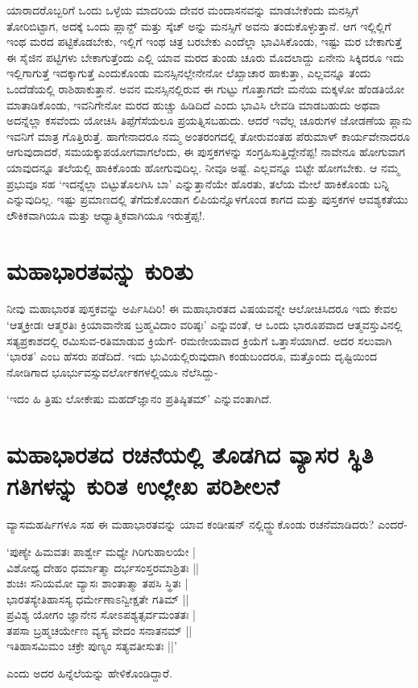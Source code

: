 ಯಾರಾದರೊಬ್ಬರಿಗೆ ಒಂದು ಒಳ್ಳೆಯ ಮಾದರಿಯ ದೇವರ ಮಂದಾಸನವನ್ನು ಮಾಡಬೇಕೆಂದು ಮನಸ್ಸಿಗೆ ತೋರಿಬಿಟ್ಟಾಗ, ಅದಕ್ಕೆ ಒಂದು ಪ್ಲಾನ್ೞ್ ಮತ್ತು ಸ್ಕೆಚ್ ಅನ್ನು ಮನಸ್ಸಿಗೆ ಅವನು ತಂದುಕೊಳ್ಳುತ್ತಾನೆ. ಆಗ ಇಲ್ಲಿಲ್ಲಿಗೆ ಇಂಥ ಮರದ ಪಟ್ಟಿಕೊಡಬೇಕು, ಇಲ್ಲಿಗೆ ಇಂಥ ಚಿತ್ರ ಬರಬೇಕು ಎಂದೆಲ್ಲಾ ಭಾವಿಸಿಕೊಂಡು, ಇಷ್ಟು ಮರ ಬೇಕಾಗುತ್ತೆ ಈ ಸೈಜಿನ ಪಟ್ಟಿಗಳು ಬೇಕಾಗುತ್ತೆಂದು ಎಲ್ಲಿ ಯಾವ ಮರದ ತುಂಡು ಚೂರು ಮೊದಲಾದ್ದು ಏನೇನು ಸಿಕ್ಕಿದರೂ ಇದು ಇಲ್ಲಿಗಾಗುತ್ತೆ ಇದಕ್ಕಾಗುತ್ತೆ ಎಂದುಕೊಂಡು ಮನಸ್ಸಿನಲ್ಲೇನೇನೋ ಲೆಖ್ಖಾಚಾರ ಹಾಕುತ್ತಾ, ಎಲ್ಲವನ್ನೂ ತಂದು ಒಂದೆಡೆಯಲ್ಲಿ ರಾಶಿಹಾಕುತ್ತಾನೆ. ಅವನ ಮನಸ್ಸಿನಲ್ಲಿರುವ ಈ ಗುಟ್ಟು ಗೊತ್ತಾಗದೇ ಮನೆಯ ಮಕ್ಕಳೋ ಹೆಂಡತಿಯೋ ಮಾತಾಡಿಕೊಂಡು, ಇವನಿಗೇನೋ ಮರದ ಹುಚ್ಚು ಹಿಡಿದಿದೆ ಎಂದು ಭಾವಿಸಿ ಲೇವಡಿ ಮಾಡಬಹುದು ಅಥವಾ ಅದನ್ನೆಲ್ಲಾ ಕಸವೆಂದು ಯೋಚಿಸಿ ತಿಪ್ಪೆಗೆಸೆಯಲೂ ಪ್ರಯತ್ನಿಸಬಹುದು. ಆದರೆ ಇವೆಲ್ಲ ಚೂರುಗಳ ಜೋಡಣೆಯ ಪ್ಲಾನು ಇವನಿಗೆ ಮಾತ್ರ ಗೊತ್ತಿರುತ್ತೆ. ಹಾಗೇನಾದರೂ ನಮ್ಮ ಅಂತರಂಗದಲ್ಲಿ ತೋರುವಂತಹ ಪೆರುಮಾಳ್ ಕಾರ್ಯವೇನಾದರೂ ಆಗುವುದಾದರೆ, ಸಮಯಕ್ಕುಪಯೋಗವಾಗಲೆಂದು, ಈ ಪುಸ್ತಕಗಳನ್ನು ಸಂಗ್ರಹಿಸುತ್ತಿದ್ದೇನೆಪ್ಪ! ನಾವೇನೂ ಹೋಗುವಾಗ ಯಾವುದನ್ನೂ ತಲೆಯಲ್ಲಿ ಹಾಕಿಕೊಂಡು ಹೋಗುವುದಿಲ್ಲ. ನೀವೂ ಅಷ್ಟೆ. ಎಲ್ಲವನ್ನೂ ಬಿಟ್ಟೇ ಹೋಗಬೇಕು. ಆ ನಮ್ಮ ಪ್ರಭುವೂ ಸಹ `ಇದನ್ನೆಲ್ಲಾ ಬಿಟ್ಟುತೊಲಗಿಸಿ ಬಾ' ಎನ್ನುತ್ತಾನೆಯೇ ಹೊರತು, ತಲೆಯ ಮೇಲೆ ಹಾಕಿಕೊಂಡು ಬನ್ನಿ ಎನ್ನುವುದಿಲ್ಲ. ಇಷ್ಟು  ಪ್ರಮಾಣದಲ್ಲಿ ತೆಗೆದುಕೊಂಡಾಗ ಲಿಪಿಯನ್ನೊಳಗೊಂಡ ಕಾಗದ ಮತ್ತು ಪುಸ್ತಕಗಳ ಆವಶ್ಯಕತೆಯು ಲೌಕಿಕವಾಗಿಯೂ ಮತ್ತು ಆಧ್ಯಾತ್ಮಿಕವಾಗಿಯೂ ಇರುತ್ತೆಪ್ಪ!.

\section*{ಮಹಾಭಾರತವನ್ನು ಕುರಿತು}

ನೀವು ಮಹಾಭಾರತ ಪುಸ್ತಕವನ್ನು ಅರ್ಪಿಸಿದಿರಿ! ಈ ಮಹಾಭಾರತದ ವಿಷಯವನ್ನೇ ಆಲೋಚಿಸಿದರೂ ಇದು ಕೇವಲ `ಆತ್ಮಕ್ರೀಡಃ ಆತ್ಮರತಿಃ ಕ್ರಿಯಾವಾನೇಷ ಬ್ರಹ್ಮವಿದಾಂ ವರಿಷ್ಠಃ' ಎನ್ನುವಂತೆ, ಆ ಒಂದು ಭಾರೂಪವಾದ ಆತ್ಮವಸ್ತುವಿನಲ್ಲಿ ಸತ್ಯಪ್ರಕಾಶದಲ್ಲಿ ರಮಿಸುವ-ರತಿಮಾಡುವ ಕ್ರಿಯೆಗೆ- ರಮಣೀಯವಾದ ಕ್ರಿಯೆಗೆ ಒತ್ತಾಸೆಯಾಗಿದೆ. ಅದರ ಸಲುವಾಗಿ `ಭಾರತ' ಎಂಬ ಹೆಸರು ಪಡೆದಿದೆ. ಇದು ಭುವಿಯಲ್ಲಿರುವುದಾಗಿ ಕಂಡುಬಂದರೂ, ಮತ್ತೊಂದು ದೃಷ್ಟಿಯಿಂದ ನೋಡಿಗಾದ ಭೂರ್ಭುವಸ್ಸುವರ್ಲೋಕಗಳಲ್ಲಿಯೂ ನೆಲೆಸಿದ್ದು-

\begin{shloka}
`ಇದಂ ಹಿ ತ್ರಿಷು ಲೋಕೇಷು ಮಹದ್‌ಜ್ಞಾನಂ ಪ್ರತಿಷ್ಠಿತಮ್' ಎನ್ನುವಂತಾಗಿದೆ.
\end{shloka}

\section*{ಮಹಾಭಾರತದ ರಚನೆಯಲ್ಲಿ ತೊಡಗಿದ ವ್ಯಾಸರ ಸ್ಥಿತಿ ಗತಿಗಳನ್ನು ಕುರಿತ ಉಲ್ಲೇಖ ಪರಿಶೀಲನೆ}

ವ್ಯಾಸಮಹರ್ಷಿಗಳೂ ಸಹ ಈ ಮಹಾಭಾರತವನ್ನು ಯಾವ ಕಂಡೀಷನ್ ನಲ್ಲಿದ್ದ್ದುಕೊಂಡು ರಚನೆಮಾಡಿದರು? ಎಂದರೆ-

\begin{shloka}
`ಪುಣ್ಯೇ ಹಿಮವತಃ ಪಾರ್ಶ್ವೇ ಮಧ್ಯೇ ಗಿರಿಗುಹಾಲಯೇ |\\
ವಿಶೋಧ್ಯ ದೇಹಂ ಧರ್ಮಾತ್ಮಾ ದರ್ಭಸಂಸ್ತರಮಾಶ್ರಿತಃ ||\\
ಶುಚಿಃ ಸನಿಯಮೋ ವ್ಯಾಸಃ ಶಾಂತಾತ್ಮಾ ತಪಸಿ ಸ್ಥಿತಃ |\\
ಭಾರತಸ್ಯೇತಿಹಾಸಸ್ಯ ಧರ್ಮೇಣಾಽನ್ವೀಕ್ಷತೇ ಗತಿಮ್ ||\\
ಪ್ರವಿಶ್ಯ ಯೋಗಂ ಜ್ಞಾನೇನ ಸೋಽಪಶ್ಯತ್ಸರ್ವಮಂತತಃ |\\
ತಪಸಾ ಬ್ರಹ್ಮಚರ್ಯೇಣ ವ್ಯಸ್ಯ ವೇದಂ ಸನಾತನಮ್ ||\\
ಇತಿಹಾಸಮಿಮಂ ಚಕ್ರೇ ಪುಣ್ಯಂ ಸತ್ಯವತೀಸುತಃ ||'
\end{shloka}
ಎಂದು ಅದರ ಹಿನ್ನೆಲೆಯನ್ನು ಹೇಳಿಕೊಂಡಿದ್ದಾರೆ.

